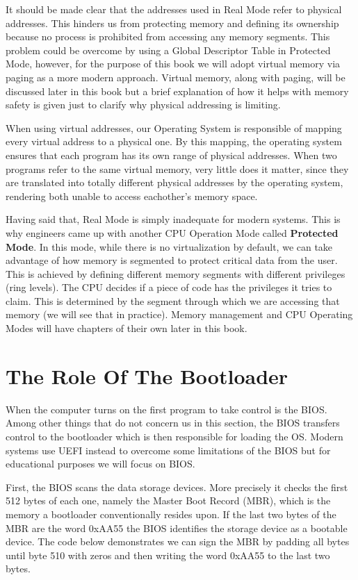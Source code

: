 It should be made clear that the addresses used in Real Mode refer to physical addresses. This hinders us from protecting
memory and defining its ownership because no process is prohibited from accessing any memory segments.
This problem could be overcome by using a Global Descriptor Table in Protected Mode, however, for the purpose of this book we 
will adopt virtual memory via paging as a more modern approach. Virtual memory, along with paging, will be discussed later in this 
book but a brief explanation of how it helps with memory safety is given just to clarify why physical addressing is limiting.

When using virtual addresses, our Operating System is responsible of mapping every virtual address to a physical one.
By this mapping, the operating system ensures that each program has its own range of physical addresses.
When two programs refer to the same virtual memory, very little does it matter, since they are translated into 
totally different physical addresses by the operating system, rendering both unable to access eachother's memory space.

Having said that, Real Mode is simply inadequate for modern systems. This is why engineers came up with another CPU 
Operation Mode called \textbf{Protected Mode}. In this mode, while there is no virtualization by default, we can 
take advantage of how memory is segmented to protect critical data from the user. This is achieved by defining different 
memory segments with different privileges (ring levels). The CPU decides if a piece of code has the privileges 
it tries to claim. This is determined by the segment through which we are accessing that memory (we will see that in
practice). Memory management and CPU Operating Modes will have chapters of their own later in this book.

\section{The Role Of The Bootloader}

When the computer turns on the first program to take control is the BIOS. Among other things that do not concern us in 
this section, the BIOS transfers control to the bootloader which is then responsible for loading the OS. Modern systems 
use UEFI instead to overcome some limitations of the BIOS but for educational purposes we will focus on BIOS.

First, the BIOS scans the data storage devices. More precisely it checks the first 512 bytes of each one, namely the Master Boot Record 
(MBR), which is the memory a bootloader conventionally resides upon. If the last two bytes of the MBR are the word 0xAA55 the BIOS 
identifies the storage device as a bootable device. The code below demonstrates we can sign the MBR by padding all bytes until byte 510
with zeros and then writing the word 0xAA55 to the last two bytes.

